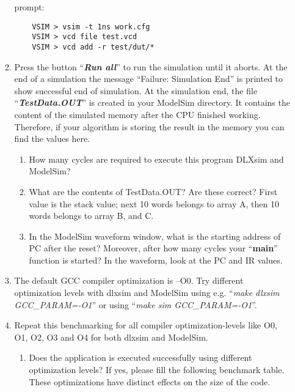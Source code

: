 \begin{enumerate}
\begin{enumerate}
	prompt:
\begin{lstlisting}
	VSIM > vsim -t 1ns work.cfg
	VSIM > vcd file test.vcd
	VSIM > vcd add -r test/dut/*
\end{lstlisting}
	\item
	Press the button ``\emph{\textbf{Run all}}'' to run the simulation
	until it aborts. At the end of a simulation the message ``Failure:
	Simulation End'' is printed to show successful end of simulation. At
	the simulation end, the file ``\emph{\textbf{TestData.OUT}}'' is
	created in your ModelSim directory. It contains the content of the
	simulated memory after the CPU finished working. Therefore, if your
	algorithm is storing the result in the memory you can find the values
	here.
		\begin{enumerate}[label=(\alph*)]
		\color{red}\item\normalcolor
		How many cycles are required to execute this program DLXsim and
		ModelSim?
		\color{red}\item\normalcolor
		What are the contents of TestData.OUT? Are these correct? First value
		is the stack value; next 10 words belongs to array A, then 10 words
		belongs to array B, and C.
		\color{red}\item\normalcolor
		In the ModelSim waveform window, what is the starting address of PC
		after the reset? Moreover, after how many cycles your
		``\textbf{main}'' function is started? In the waveform, look at the PC
		and IR values.
		\end{enumerate}
	\item The default GCC compiler optimization is --O0. Try different
		optimization levels with dlxsim and ModelSim using e.g. ``\emph{make
			dlxsim GCC\_PARAM=-O1}'' or using ``\emph{make sim
			GCC\_PARAM=-O1}''.
	\item Repeat this benchmarking for all compiler optimization-levels like
		O0, O1, O2, O3 and O4 for both dlxsim and ModelSim.
		\begin{enumerate}[label=(\alph*)]
		\color{red}\item\normalcolor Does the application is executed successfully using different optimization levels? If yes, please fill the following benchmark table. These optimizations have distinct effects on the size of the code.
		\end{enumerate}
	\end{enumerate}
\end{enumerate}
